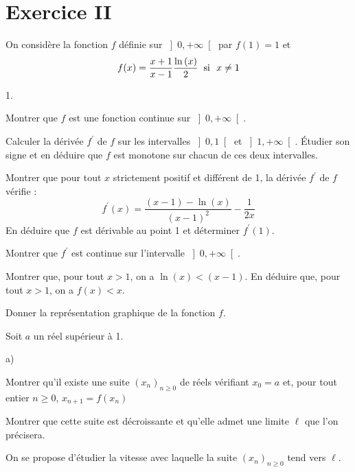 \documentclass[11pt]{article}%
\begin{document}
\section*{Exercice II}

On considère la fonction $f$ définie sur $\left] 0, + \infty \right[ $
par $f(1) = 1$ et 
\[
f(x) = \dfrac{x + 1}{x-1}\dfrac{\ln \left( x\right) }{2}\;\;\text{si\ \
}x\neq 1
\]

\begin{noliste}{1.}
 \setlength{\itemsep}{4mm}
\item Montrer que $f$ est une fonction continue sur $\left] 0, + \infty
\right[.$

\item Calculer la dérivée $f^{\prime }$ de $f$ sur les intervalles
$\left]
0,1\right[ $ et $\left] 1, + \infty \right[ $. Étudier son signe et en
déduire
que $f$ est monotone sur chacun de ces deux intervalles.

\item Montrer que pour tout $x$ strictement positif et différent de 1,
la dérivée $f^{\prime }$ de $f$ vérifie : 
\[
f^{\prime }\left( x\right) = \dfrac{\left( x-1\right) -\ln \left(
x\right) }{\left( x-1\right) ^{2}}-\dfrac{1}{2x}
\]
En déduire que $f$ est dérivable au point 1 et déterminer $f^{\prime
}\left(
1\right) $.

Montrer que $f^{\prime }$ est continue sur l'intervalle $\left] 0, +
\infty \right[.$

\item Montrer que, pour tout $x>1$, on a $\ln \left( x\right) <\left(
x-1\right) $. En déduire que, pour tout $x>1$, on a $f(x)<x.$

\item Donner la représentation graphique de la fonction $f$.

\item Soit $a$ un réel supérieur à 1.

\begin{noliste}{a)}
 \setlength{\itemsep}{2mm}
\item Montrer qu'il existe une suite $\left( x_{n}\right)_{n\geq 0}$ de
réels vérifiant $x_{0} = a$ et, pour tout entier $n\geq 0$, $x_{n + 1}
= f\left(
x_{n}\right) $

\item Montrer que cette suite est décroissante et qu'elle admet une
limite $\ell $ que l'on précisera.
\end{noliste}

\item On se propose d'étudier la vitesse avec laquelle la suite $\left(
x_{n}\right)_{n\geq 0}$ tend vers $\ell $.


\end{noliste}
\end{document}
